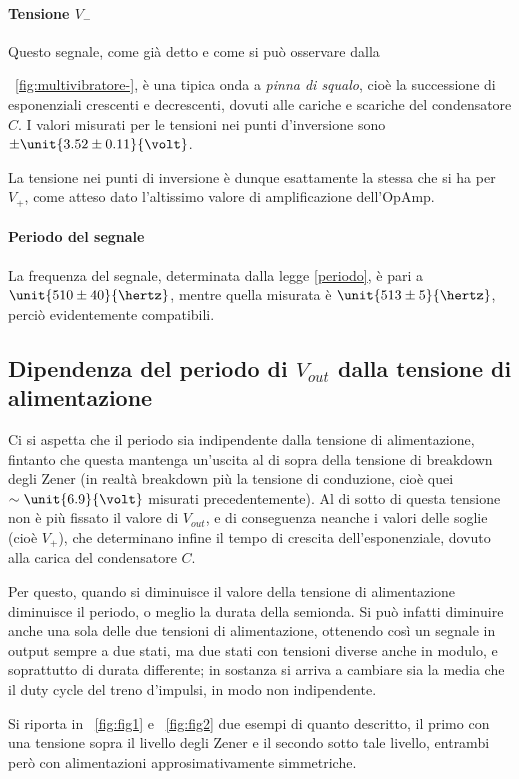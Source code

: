 \documentclass[10pt,a4paper]{article}
\begin{document}
\paragraph{Tensione $V_-$} Questo segnale, come già detto e come si può osservare dalla \figurename{~\ref{fig:multivibratore-}, è una tipica onda a \emph{pinna di squalo}, cioè la successione di esponenziali crescenti e decrescenti, dovuti alle cariche e scariche del condensatore $C$. I valori misurati per le tensioni nei punti d'inversione sono $\pm \unit{3.52 \pm 0.11}{\volt}$.
	
La tensione nei punti di inversione è dunque esattamente la stessa che si ha per $V_+$, come atteso dato l'altissimo valore di amplificazione dell'OpAmp.

\paragraph{Periodo del segnale} La frequenza del segnale, determinata dalla legge \eqref{periodo}, è pari a $\unit{510 \pm 40}{\hertz}$, mentre quella misurata è $\unit{513 \pm 5}{\hertz}$, perciò evidentemente compatibili.

\subsection{Dipendenza del periodo di $V_{out}$ dalla tensione di alimentazione}
Ci si aspetta che il periodo sia indipendente dalla tensione di alimentazione, fintanto che questa mantenga un'uscita al di sopra della tensione di breakdown degli Zener (in realtà breakdown più la tensione di conduzione, cioè quei $\sim \unit{6.9}{\volt}$ misurati precedentemente).
Al di sotto di questa tensione non è più fissato il valore di $V_{out}$, e di conseguenza neanche i valori delle soglie (cioè $V_+$), che determinano infine il tempo di crescita dell'esponenziale, dovuto alla carica del condensatore $C$.

Per questo, quando si diminuisce il valore della tensione di alimentazione diminuisce il periodo, o meglio la durata della semionda. Si può infatti diminuire anche una sola delle due tensioni di alimentazione, ottenendo così un segnale in output sempre a due stati, ma due stati con tensioni diverse anche in modulo, e soprattutto di durata differente; in sostanza si arriva a cambiare sia la media che il duty cycle del treno d'impulsi, in modo non indipendente.

Si riporta in \figurename{~\ref{fig:fig1}} e \figurename{~\ref{fig:fig2}} due esempi di quanto descritto, il primo con una tensione sopra il livello degli Zener e il secondo sotto tale livello, entrambi però con alimentazioni approsimativamente simmetriche.

}
\end{document}
